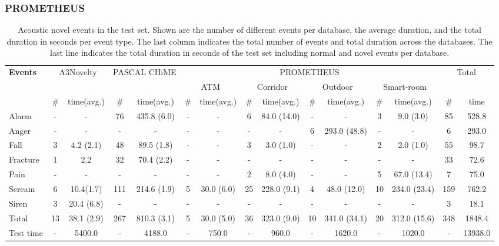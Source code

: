 \subsubsection{PROMETHEUS}
\begin{table}[t]
	\centering
	\tabcolsep=0.10cm
	\renewcommand{\arraystretch}{1.0}
	\caption[Acoustic novel events]{Acoustic novel events in the test set. Shown are the number of different events per database, the average duration, and the total duration in seconds per event type. The last column indicates the total number of events and total duration across the databases. The last line indicates the total duration in seconds of the test set including normal and novel events per database.}
	
	\begin{tabular}{ l || c c || c c || c c | c c | c c | c c || c c }
		\textbf{Events} & \multicolumn{2}{|c||}{A3Novelty} & \multicolumn{2}{|c||}{PASCAL CHiME} & \multicolumn{8}{|c||}{PROMETHEUS} & \multicolumn{2}{|c}{Total}\\
		\textbf{} & \multicolumn{2}{|c||}{} & \multicolumn{2}{|c||}{} & \multicolumn{2}{|c|}{ATM} & \multicolumn{2}{|c|}{Corridor} & \multicolumn{2}{|c|}{Outdoor} & \multicolumn{2}{|c||}{Smart-room} & \multicolumn{2}{|c}{}\\
		\textbf{} & \# & time(avg.) & \# & time(avg.) & \# & time(avg.) & \# & time(avg.) & \# & time(avg.) & \# & time(avg.) & \# & time\\
		\hline
		Alarm			& - & -		& 76 & 435.8 (6.0) 	 				& - & -			& 6 & 84.0 (14.0)	& - & -				& 3 & 9.0 (3.0)		& 85 & 528.8\\
		Anger			& - & - 				& - & - 				& - & -			& - & -				& 6 & 293.0 (48.8)		& - & - 			& 6 & 293.0\\  
		Fall 			& 3 & 4.2 (2.1)		& 48 & 89.5 (1.8) 	& - & -	 		& 3 & 3.0 (1.0)		& - & -				& 2 & 2.0 (1.0) 		& 55 & 98.7\\
		Fracture		& 1 & 2.2 			& 32 & 70.4 (2.2) 	& - & - 			& - & -				& - & -				& - & - 				& 33 & 72.6\\
		Pain			& - & -			 	& - & - 			& - & -	 		& 2 & 8.0 (4.0)		& - & -				& 5 & 67.0 (13.4) 		& 7 & 75.0\\
		Scream			& 6 & 10.4(1.7)		& 111 & 214.6 (1.9) 	& 5 & 30.0 (6.0)	& 25 & 228.0 (9.1)	& 4 & 48.0 (12.0)		& 10 & 234.0 (23.4) & 159 & 762.2\\
		Siren			& 3 & 20.4 (6.8)		& - & - 				& - & - 			& - & -				& - & -				& - & -				& 3 & 18.1\\
		\hline
		Total			& 13 & 38.1 (2.9) & 267 & 810.3 (3.1) 	& 5 & 30.0 (5.0) 		& 36 & 323.0 (9.0) 	& 10 & 341.0 (34.1) 	& 20 & 312.0 (15.6) & 348 & 1848.4\\
		\hline\hline
		Test time & - & 5400.0 				& - & 4188.0 	& - & 750.0			& - & 960.0	& - & 1620.0				& - & 1020.0		& - & 13938.0\\
		
	\end{tabular}
	\label{tab:events}
\end{table}

